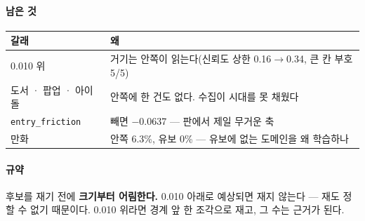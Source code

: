\documentclass[10pt]{article}
\begin{document}
\paragraph{남은 것}
\begin{center}\small
\begin{tabular}{ll}
\hline
갈래 & 왜 \\
\hline
0.010 위 & 거기는 안쪽이 읽는다(신뢰도 상한 0.16$\to$0.34, 큰 칸 부호 5/5) \\
도서 · 팝업 · 아이돌 & 안쪽에 한 건도 없다. 수집이 시대를 못 채웠다 \\
\texttt{entry\_friction} & 빼면 $-$0.0637 --- 판에서 제일 무거운 축 \\
만화 & 안쪽 6.3\%, 유보 0\% --- 유보에 없는 도메인을 왜 학습하나 \\
\hline
\end{tabular}
\end{center}

\paragraph{규약} 후보를 재기 전에 \textbf{크기부터 어림한다.} 0.010 아래로
예상되면 재지 않는다 --- 재도 정할 수 없기 때문이다. 0.010 위라면 경계 앞
한 조각으로 재고, 그 수는 근거가 된다.
\end{document}
